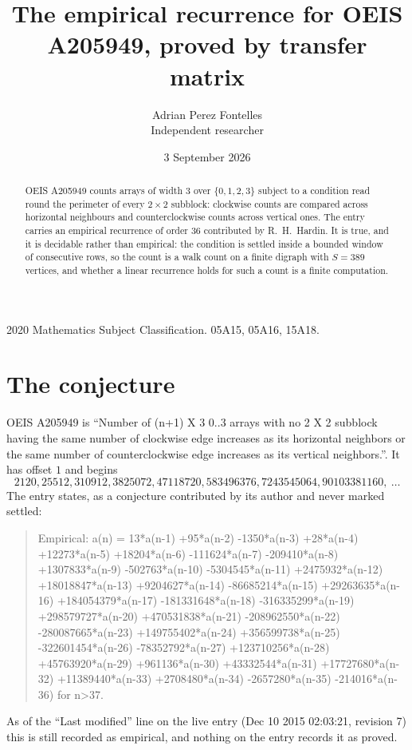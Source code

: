 \documentclass[11pt,a4paper]{article}
\title{The empirical recurrence for OEIS A205949, proved by transfer matrix}
\author{Adrian Perez Fontelles\\ \small Independent researcher}
\date{3 September 2026}
\theoremstyle{plain}
\theoremstyle{definition}
\begin{document}
\maketitle

\begin{abstract}
OEIS A205949 counts arrays of width $3$ over $\{0,1,2,3\}$ subject to a condition read round the
perimeter of every $2\times2$ subblock: clockwise counts are compared across horizontal neighbours and counterclockwise counts across vertical ones. The entry carries an empirical recurrence of
order $36$ contributed by R.~H.~Hardin. It is true, and it is decidable rather than
empirical: the condition is settled inside a bounded window of consecutive rows, so the
count is a walk count on a finite digraph with $S=389$ vertices, and whether a linear
recurrence holds for such a count is a finite computation.
\end{abstract}

\noindent\small 2020 Mathematics Subject Classification. 05A15, 05A16, 15A18.\normalsize

\section{The conjecture}

OEIS A205949 is ``Number of (n+1) X 3 0..3 arrays with no 2 X 2 subblock having the same number of clockwise edge increases as its horizontal neighbors or the same number of counterclockwise edge increases as its vertical neighbors.''. It has offset $1$ and begins
\[
2120, 25512, 310912, 3825072, 47118720, 583496376, 7243545064, 90103381160,\ \dots
\]
The entry states, as a conjecture contributed by its author and never marked settled:
\begin{quote}
Empirical: a(n) = 13*a(n-1) +95*a(n-2) -1350*a(n-3) +28*a(n-4) +12273*a(n-5) +18204*a(n-6) -111624*a(n-7) -209410*a(n-8) +1307833*a(n-9) -502763*a(n-10) -5304545*a(n-11) +2475932*a(n-12) +18018847*a(n-13) +9204627*a(n-14) -86685214*a(n-15) +29263635*a(n-16) +184054379*a(n-17) -181331648*a(n-18) -316335299*a(n-19) +298579727*a(n-20) +470531838*a(n-21) -208962550*a(n-22) -280087665*a(n-23) +149755402*a(n-24) +356599738*a(n-25) -322601454*a(n-26) -78352792*a(n-27) +123710256*a(n-28) +45763920*a(n-29) +961136*a(n-30) +43332544*a(n-31) +17727680*a(n-32) +11389440*a(n-33) +2708480*a(n-34) -2657280*a(n-35) -214016*a(n-36) for n>37.
\end{quote}
As of the ``Last modified'' line on the live entry (Dec 10 2015 02:03:21, revision 7) this is still
recorded as empirical, and nothing on the entry records it as proved.
\end{document}
